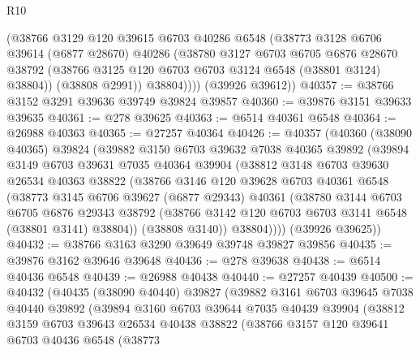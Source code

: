 \begin{lexlean}{R10}
\begin{coremodule}
            (@38766
              @3129
              @120
              @39615
              @6703
              @40286
              @6548
              (@38773
                @3128
                @6706
                @39614
                (@6877 @28670)
                @40286
                (@38780
                  @3127
                  @6703
                  @6705
                  @6876
                  @28670
                  @38792
                  (@38766 @3125 @120 @6703 @6703 @3124 @6548 (@38801 @3124) @38804))
                (@38808 @2991))
              @38804))))
      (@39926 @39612))
@40357 := @38766 @3152 @3291 @39636 @39749 @39824 @39857
@40360 := @39876 @3151 @39633 @39635
@40361 := @278 @39625
@40363 := @6514 @40361 @6548
@40364 := @26988 @40363
@40365 := @27257 @40364
@40426 := @40357
    (@40360
      (@38090 @40365)
      @39824
      (@39882
        @3150
        @6703
        @39632
        @7038
        @40365
        @39892
        (@39894
          @3149
          @6703
          @39631
          @7035
          @40364
          @39904
          (@38812
            @3148
            @6703
            @39630
            @26534
            @40363
            @38822
            (@38766
              @3146
              @120
              @39628
              @6703
              @40361
              @6548
              (@38773
                @3145
                @6706
                @39627
                (@6877 @29343)
                @40361
                (@38780
                  @3144
                  @6703
                  @6705
                  @6876
                  @29343
                  @38792
                  (@38766 @3142 @120 @6703 @6703 @3141 @6548 (@38801 @3141) @38804))
                (@38808 @3140))
              @38804))))
      (@39926 @39625))
@40432 := @38766 @3163 @3290 @39649 @39748 @39827 @39856
@40435 := @39876 @3162 @39646 @39648
@40436 := @278 @39638
@40438 := @6514 @40436 @6548
@40439 := @26988 @40438
@40440 := @27257 @40439
@40500 := @40432
    (@40435
      (@38090 @40440)
      @39827
      (@39882
        @3161
        @6703
        @39645
        @7038
        @40440
        @39892
        (@39894
          @3160
          @6703
          @39644
          @7035
          @40439
          @39904
          (@38812
            @3159
            @6703
            @39643
            @26534
            @40438
            @38822
            (@38766
              @3157
              @120
              @39641
              @6703
              @40436
              @6548
              (@38773

\end{coremodule}
\end{lexlean}
